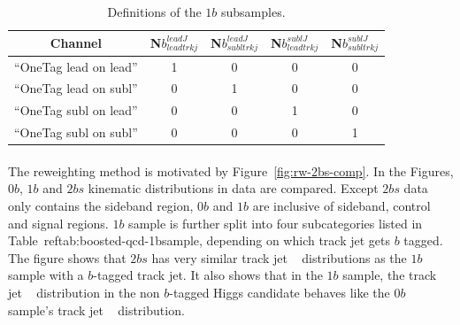 \begin{table}[htbp!]
\begin{center}
\caption{Definitions of the $1b$ subsamples.}
\begin{tabular}{c|c|c|c|c}
\hline
  Channel & N$b^{leadJ}_{leadtrkj}$ & N$b^{leadJ}_{subltrkj}$ & N$b^{sublJ}_{leadtrkj}$ & N$b^{sublJ}_{subltrkj}$ \\
  \hline
  ``OneTag lead on lead'' & 1 & 0 & 0 & 0 \\
  ``OneTag lead on subl'' & 0 & 1 & 0 & 0 \\
  ``OneTag subl on lead'' & 0 & 0 & 1 & 0 \\
  ``OneTag subl on subl'' & 0 & 0 & 0 & 1 \\
  \end{tabular}
\label{tab:boosted-qcd-1bsample}
\end{center}
\end{table}

\paragraph{}
The reweighting method is motivated by Figure~\ref{fig:rw-2bs-comp}.
In the Figures, 0$b$, $1b$ and $2bs$ kinematic distributions in data are compared.
Except $2bs$ data only contains the sideband region, 0$b$ and $1b$ are inclusive of sideband, control and signal regions.
$1b$ sample is further split into four subcategories listed in Table~ref{tab:boosted-qcd-1bsample}, depending on which track jet gets $b$ tagged.
The figure shows that $2bs$ has very similar track jet \pt~ distributions as the $1b$ sample with a $b$-tagged track jet.
It also shows that in the $1b$ sample, the track jet \pt~ distribution in the non $b$-tagged Higgs candidate behaves like the 0$b$ sample's track jet \pt~ distribution.

